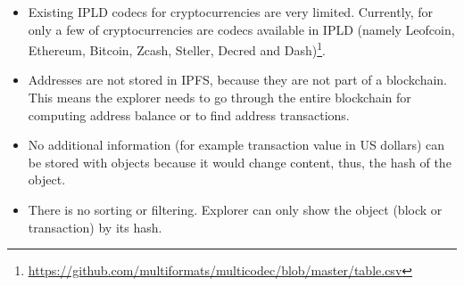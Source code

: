\begin{itemize}
    \item Existing IPLD codecs for cryptocurrencies are very limited. Currently, for only a few of cryptocurrencies are codecs available in IPLD (namely Leofcoin, Ethereum, Bitcoin, Zcash, Steller, Decred and Dash)\footnote{\url{https://github.com/multiformats/multicodec/blob/master/table.csv}}.
    \item Addresses are not stored in IPFS, because they are not part of a blockchain. This means the explorer needs to go through the entire blockchain for computing address balance or to find address transactions.
    \item No additional information (for example transaction value in US dollars) can be stored with objects because it would change content, thus, the hash of the object.
    \item There is no sorting or filtering. Explorer can only show the object (block or transaction) by its hash. 
\end{itemize}




